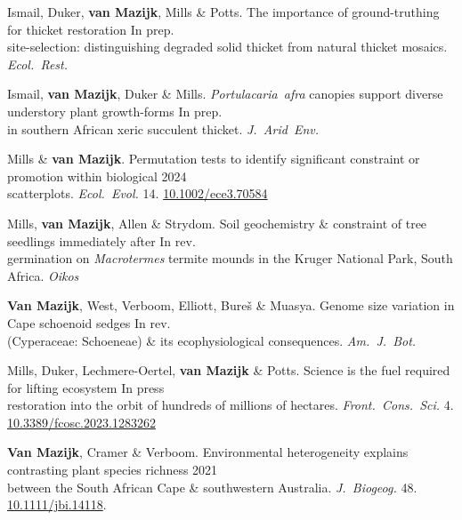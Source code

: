 Ismail, Duker, \textbf{van Mazijk}, Mills \& Potts.
The importance of ground-truthing for thicket restoration    \hfill In prep. \\
\hspace{2em} site-selection: distinguishing degraded solid thicket from natural thicket mosaics. \textit{Ecol.~Rest.}

Ismail, \textbf{van Mazijk}, Duker \& Mills.
\textit{Portulacaria~afra} canopies support diverse understory plant growth-forms
                                                              \hfill In prep. \\
\hspace{2em} in southern African xeric succulent thicket. \textit{J.~Arid~Env.}

Mills \& \textbf{van Mazijk}.
Permutation tests to identify significant constraint or promotion within biological \hfill 2024 \\
\hspace{2em} scatterplots.
  \textit{Ecol.~Evol.}
  14. \href{http://dx.doi.org/10.1002/ece3.70584}{10.1002/ece3.70584}

Mills, \textbf{van Mazijk}, Allen \& Strydom.
Soil geochemistry \& constraint of tree seedlings immediately after
                                                              \hfill In rev. \\
\hspace{2em} germination on \textit{Macrotermes} termite
  mounds in the Kruger National Park, South Africa.
  \textit{Oikos}

\textbf{Van Mazijk}, West, Verboom, Elliott, Bureš \& Muasya.
Genome size variation in Cape schoenoid sedges                \hfill In rev. \\
\hspace{2em} (Cyperaceae: Schoeneae) \& its ecophysiological consequences.
  \textit{Am.~J.~Bot.}

Mills, Duker, Lechmere-Oertel, \textbf{van Mazijk} \& Potts.
Science is the fuel required for lifting ecosystem             \hfill In press \\
\hspace{2em} restoration into the orbit of hundreds of millions of hectares.
  \textit{Front.~Cons.~Sci.}
  4. \\
  \hspace{2em} \href{https://doi.org/10.3389/fcosc.2023.1283262}{10.3389/fcosc.2023.1283262}

\textbf{Van Mazijk}, Cramer \& Verboom.
Environmental heterogeneity explains contrasting plant species richness
                                                                  \hfill 2021 \\
\hspace{2em}
  between the South African Cape \& southwestern Australia.
  \textit{J.~Biogeog.}
  48. \href{https://doi.org/10.1111/jbi.14118}{10.1111/jbi.14118}.


